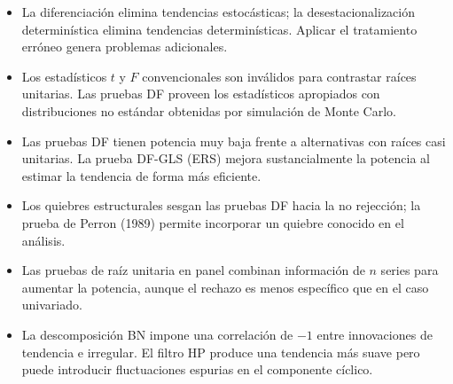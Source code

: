 \documentclass[12pt]{article}
\begin{document}
\begin{itemize}
  \item La diferenciaci\'on elimina tendencias estoc\'asticas; la
        desestacionalizaci\'on determin\'istica elimina tendencias
        determin\'isticas. Aplicar el tratamiento err\'oneo genera
        problemas adicionales.
  \item Los estad\'isticos $t$ y $F$ convencionales son inv\'alidos para
        contrastar ra\'ices unitarias. Las pruebas DF proveen los
        estad\'isticos apropiados con distribuciones no est\'andar
        obtenidas por simulaci\'on de Monte Carlo.
  \item Las pruebas DF tienen potencia muy baja frente a alternativas con
        ra\'ices casi unitarias. La prueba DF-GLS (ERS) mejora
        sustancialmente la potencia al estimar la tendencia de forma
        m\'as eficiente.
  \item Los quiebres estructurales sesgan las pruebas DF hacia la no
        rejecci\'on; la prueba de Perron (1989) permite incorporar un
        quiebre conocido en el an\'alisis.
  \item Las pruebas de ra\'iz unitaria en panel combinan informaci\'on de
        $n$ series para aumentar la potencia, aunque el rechazo es menos
        espec\'ifico que en el caso univariado.
  \item La descomposici\'on BN impone una correlaci\'on de $-1$ entre
        innovaciones de tendencia e irregular. El filtro HP produce una
        tendencia m\'as suave pero puede introducir fluctuaciones espurias
        en el componente c\'iclico.
\end{itemize}
\end{document}
